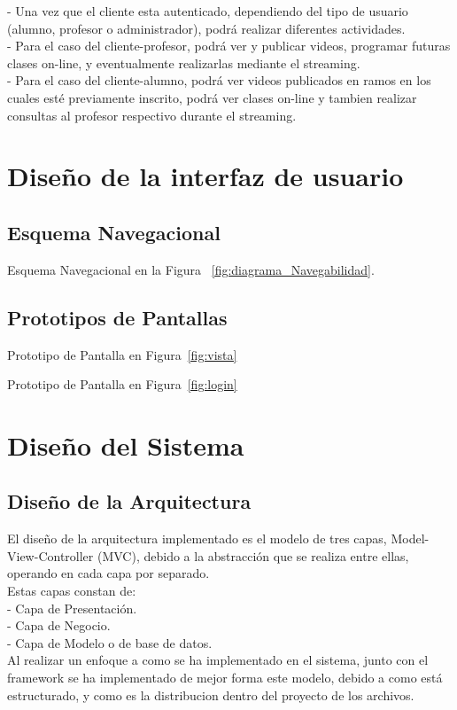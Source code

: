 \documentclass[12pt]{article}
\begin{document}
-	Una vez que el cliente esta autenticado, dependiendo del tipo de usuario (alumno, profesor o 
administrador), podrá realizar diferentes actividades.\\

-	Para el caso del cliente-profesor, podrá ver y publicar videos, programar futuras clases on-line, 
y eventualmente realizarlas mediante el streaming.\\

-	Para el caso del cliente-alumno, podrá ver videos publicados en ramos en los cuales esté previamente
inscrito, podrá ver clases on-line y tambien realizar consultas al profesor respectivo durante el 
streaming.

\newpage
\section{Dise\~no de la interfaz de usuario}
\subsection{Esquema Navegacional}
Esquema Navegacional en la Figura ~\ref{fig:diagrama_Navegabilidad}.

\subsection{Prototipos de Pantallas}
Prototipo de Pantalla en Figura~\ref{fig:vista}

Prototipo de Pantalla en Figura~\ref{fig:login}

\newpage
\section{Dise\~no del Sistema}
\subsection{Dise\~no de la Arquitectura}
El dise\~no de la arquitectura implementado es el modelo de tres capas, Model-View-Controller (MVC), debido a la abstracción que se realiza entre ellas, operando en cada capa por separado.\\
Estas capas constan de:\\
-	Capa de Presentación.\\
-	Capa de Negocio.\\
-	Capa de Modelo o de base de datos.\\

Al realizar un enfoque a como se ha implementado en el sistema, junto con el framework se ha implementado de mejor 
forma este modelo, debido a como está estructurado, y como es la distribucion dentro del proyecto de los archivos.
\end{document}
